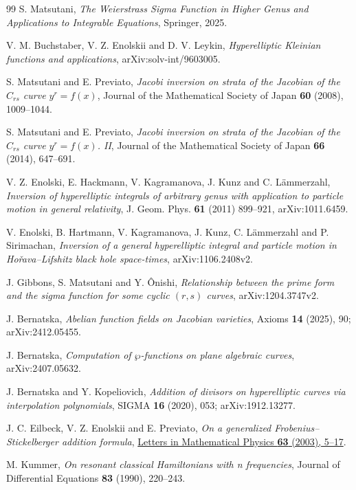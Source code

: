 \documentclass[11pt]{article}
\begin{document}
\begin{thebibliography}{99}
S. Matsutani, \emph{The Weierstrass Sigma Function in Higher Genus and Applications to Integrable Equations}, Springer, 2025.

V. M. Buchstaber, V. Z. Enolskii and D. V. Leykin, \emph{Hyperelliptic Kleinian functions and applications}, arXiv:solv-int/9603005.

S. Matsutani and E. Previato, \emph{Jacobi inversion on strata of the Jacobian of the $C_{rs}$ curve $y^r=f(x)$}, Journal of the Mathematical Society of Japan \textbf{60} (2008), 1009--1044.

S. Matsutani and E. Previato, \emph{Jacobi inversion on strata of the Jacobian of the $C_{rs}$ curve $y^r=f(x)$. II}, Journal of the Mathematical Society of Japan \textbf{66} (2014), 647--691.

V. Z. Enolski, E. Hackmann, V. Kagramanova, J. Kunz and C. L\"ammerzahl, \emph{Inversion of hyperelliptic integrals of arbitrary genus with application to particle motion in general relativity}, J. Geom. Phys. \textbf{61} (2011) 899--921, arXiv:1011.6459.

V. Enolski, B. Hartmann, V. Kagramanova, J. Kunz, C. L\"ammerzahl and P. Sirimachan, \emph{Inversion of a general hyperelliptic integral and particle motion in Hořava--Lifshitz black hole space-times}, arXiv:1106.2408v2.

J. Gibbons, S. Matsutani and Y. \^Onishi, \emph{Relationship between the prime form and the sigma function for some cyclic $(r,s)$ curves}, arXiv:1204.3747v2.

J. Bernatska, \emph{Abelian function fields on Jacobian varieties}, Axioms \textbf{14} (2025), 90; arXiv:2412.05455.

J. Bernatska, \emph{Computation of $\wp$-functions on plane algebraic curves}, arXiv:2407.05632.

J. Bernatska and Y. Kopeliovich, \emph{Addition of divisors on hyperelliptic curves via interpolation polynomials}, SIGMA \textbf{16} (2020), 053; arXiv:1912.13277.

J. C. Eilbeck, V. Z. Enolskii and E. Previato, \emph{On a generalized Frobenius--Stickelberger addition formula}, \href{https://doi.org/10.1023/A:1022918717546}{Letters in Mathematical Physics \textbf{63} (2003), 5--17}.

M. Kummer, \emph{On resonant classical Hamiltonians with n frequencies}, Journal of Differential Equations \textbf{83} (1990), 220--243.


\end{thebibliography}
\end{document}
